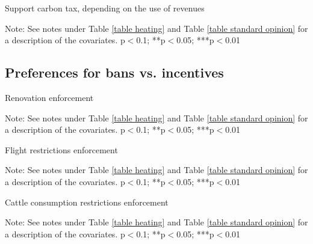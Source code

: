 \documentclass{article}
\begin{document}
\begin{landscape}
	\begin{table}[h!]
	\caption{Support carbon tax, depending on the use of revenues}
	\begin{center}
		\scalebox{0.6}{}
	\end{center}
	{\footnotesize Note: See notes under Table \ref{table heating} and Table \ref{table standard opinion} for a description of the covariates.
	\newline *p$<$0.1; **p$<$0.05; ***p$<$0.01}
\end{table}	
\end{landscape}

\clearpage
\subsection{Preferences for bans vs. incentives}

\begin{table}[h!]
	\caption{Renovation enforcement}
	\begin{center}
		\scalebox{0.7}{}
	\end{center}
	{\footnotesize Note: See notes under Table \ref{table heating} and Table \ref{table standard opinion} for a description of the covariates.
	\newline *p$<$0.1; **p$<$0.05; ***p$<$0.01}
\end{table}	

\begin{landscape}
	\begin{table}[h!]
	\caption{Flight restrictions enforcement}
	\begin{center}
		\scalebox{0.6}{}
	\end{center}
	{\footnotesize Note: See notes under Table \ref{table heating} and Table \ref{table standard opinion} for a description of the covariates.
	\newline *p$<$0.1; **p$<$0.05; ***p$<$0.01}
\end{table}	
\end{landscape}

\begin{table}[h!]
	\caption{Cattle consumption restrictions enforcement}
	\begin{center}
		\scalebox{0.7}{}
	\end{center}
	{\footnotesize Note: See notes under Table \ref{table heating} and Table \ref{table standard opinion} for a description of the covariates.
	\newline *p$<$0.1; **p$<$0.05; ***p$<$0.01}
\end{table}	
\end{document}
